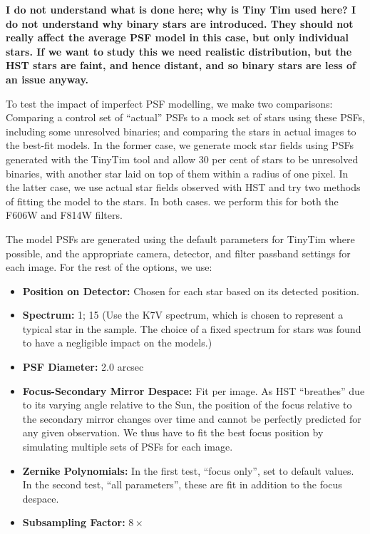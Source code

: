 \documentclass[useAMS,usenatbib]{mnras}
\begin{document}
{\bf I do not understand what is done here; why is Tiny Tim used here? I do not understand
why binary stars are introduced. They should not really affect the average PSF model in this
case, but only individual stars. If we want to study this we need realistic distribution, but
the HST stars are faint, and hence distant, and so binary stars are less of an issue anyway.}


To test the impact of imperfect PSF modelling, we make two
comparisons: Comparing a control set of ``actual'' PSFs to a mock set
of stars using these PSFs, including some unresolved binaries; and
comparing the stars in actual images to the best-fit models. In the
former case, we generate mock star fields using PSFs generated with
the TinyTim tool \citep{2011SPIE.8127E..0JK} and allow 30 per cent of
stars to be unresolved binaries, with another star laid on top of them
within a radius of one pixel. In the latter case, we use actual star
fields observed with HST and try two methods of fitting the model to
the stars. In both cases. we perform this for both the F606W and F814W
filters.

The model PSFs are generated using the default parameters for TinyTim
where possible, and the appropriate camera, detector, and filter
passband settings for each image. For the rest of the options, we use:
\begin{itemize}
  \item \textbf{Position on Detector:} Chosen for each star based on its
detected position.
  \item \textbf{Spectrum:} 1; 15 (Use the K7V spectrum, which is chosen
to represent a typical star in the sample. The choice of a fixed
spectrum for stars was found to have a negligible impact on the
models.)
  \item \textbf{PSF Diameter:} 2.0 arcsec
  \item \textbf{Focus-Secondary Mirror Despace:} Fit per image. As HST
    ``breathes'' due to its varying angle relative to the Sun, the
    position of the focus relative to the secondary mirror changes
    over time and cannot be perfectly predicted for any given
    observation. We thus have to fit the best focus position by
    simulating multiple sets of PSFs for each image.
  \item \textbf{Zernike Polynomials:} In the first test, ``focus
    only'', set to default values. In the second test, ``all
    parameters'', these are fit in addition to the focus despace.
  \item \textbf{Subsampling Factor:} $8\times$
\end{itemize}
\end{document}
